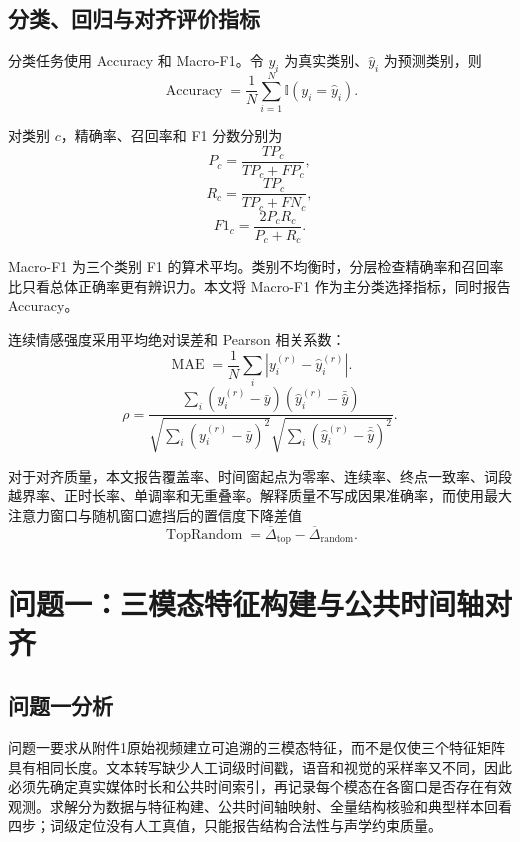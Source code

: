 \documentclass{gmcmthesis}
\begin{document}
\subsection{分类、回归与对齐评价指标}
分类任务使用 Accuracy 和 Macro-F1。令 $y_i$ 为真实类别、$\hat y_i$ 为预测类别，则
\begin{equation}
\operatorname{Accuracy}=\frac{1}{N}\sum_{i=1}^{N}\mathbb{I}(y_i=\hat y_i).
\label{eq:accuracy}
\end{equation}
\par\indent 对类别 $c$，精确率、召回率和 F1 分数分别为
\begin{equation}
P_c=\frac{TP_c}{TP_c+FP_c},
\label{eq:class_precision}
\end{equation}
\begin{equation}
R_c=\frac{TP_c}{TP_c+FN_c},
\label{eq:class_recall}
\end{equation}
\begin{equation}
F1_c=\frac{2P_cR_c}{P_c+R_c}.
\label{eq:class_f1}
\end{equation}
\par\indent Macro-F1 为三个类别 F1 的算术平均。类别不均衡时，分层检查精确率和召回率比只看总体正确率更有辨识力\cite{zhou2016machinelearning,li2019statisticallearning}。本文将 Macro-F1 作为主分类选择指标，同时报告 Accuracy。
\par\indent 连续情感强度采用平均绝对误差和 Pearson 相关系数：
\begin{equation}
\operatorname{MAE}=\frac{1}{N}\sum_i|y_i^{(r)}-\hat y_i^{(r)}|.
\label{eq:mae}
\end{equation}
\begin{equation}
\rho=\frac{\sum_i(y_i^{(r)}-\bar y)(\hat y_i^{(r)}-\bar{\hat y})}{\sqrt{\sum_i(y_i^{(r)}-\bar y)^2}\sqrt{\sum_i(\hat y_i^{(r)}-\bar{\hat y})^2}}.
\label{eq:pearson}
\end{equation}
\par\indent 对于对齐质量，本文报告覆盖率、时间窗起点为零率、连续率、终点一致率、词段越界率、正时长率、单调率和无重叠率。解释质量不写成因果准确率，而使用最大注意力窗口与随机窗口遮挡后的置信度下降差值
\begin{equation}
\operatorname{TopRandom}=\overline{\Delta}_{\mathrm{top}}-\overline{\Delta}_{\mathrm{random}}.
\label{eq:top_random}
\end{equation}
\clearpage
\section{问题一：三模态特征构建与公共时间轴对齐}
\subsection{问题一分析}
问题一要求从附件1原始视频建立可追溯的三模态特征，而不是仅使三个特征矩阵具有相同长度。文本转写缺少人工词级时间戳，语音和视觉的采样率又不同，因此必须先确定真实媒体时长和公共时间索引，再记录每个模态在各窗口是否存在有效观测。求解分为数据与特征构建、公共时间轴映射、全量结构核验和典型样本回看四步；词级定位没有人工真值，只能报告结构合法性与声学约束质量。
\end{document}
